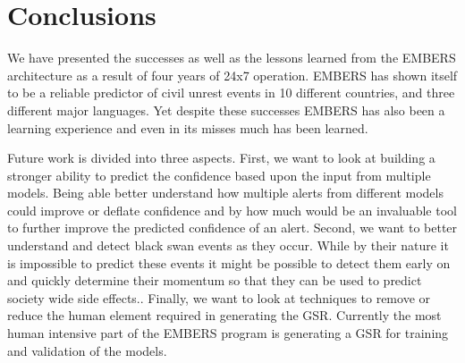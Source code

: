 \section{Conclusions}
We have presented the successes as well as the lessons learned from the EMBERS
architecture as a result of four years of 24x7 operation.  EMBERS has shown
itself to be a reliable predictor of civil unrest events in 10 different
countries, and three different major languages.  Yet despite these successes
EMBERS has also been a learning experience and even in its misses much has been
learned.


Future work is divided into three aspects.
First, we want to look at building a stronger ability to predict the confidence
based upon the input from multiple models.  Being able better understand how multiple
alerts from different models could improve or deflate confidence and by how much would
be an invaluable tool to further improve the predicted confidence of an alert.
Second, we want to better understand and detect black swan events as they
occur.  While by their nature it is impossible to predict these events it might
be possible to detect them early on and quickly determine their momentum so
that they can be used to predict society wide side effects..
Finally, we want to look at techniques to remove or reduce the human element required in generating the GSR.  Currently the most human intensive part of the EMBERS program is generating a GSR for training and validation of the models.

